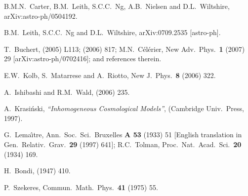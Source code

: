 \documentclass[12pt]{article}
\begin{document}
\begin{thebibliography}{66}
B.M.N.~Carter, B.M.~Leith, S.C.C.~Ng, A.B.~Nielsen and D.L.~Wiltshire,
arXiv:astro-ph/0504192.

B.M.~Leith, S.C.C.~Ng and D.L.~Wiltshire,
arXiv:0709.2535 [astro-ph].

T.~Buchert,
 (2005) L113; %
 (2006) 817; %
M.N.~C\'el\'erier,
New Adv.\ Phys.\ {\bf1} (2007) 29 [arXiv:astro-ph/0702416];
and references therein.

E.W.~Kolb, S.~Matarrese and A.~Riotto,
New J.\ Phys.\ {\bf8} (2006) 322. %

A.~Ishibashi and R.M.~Wald,
 (2006) 235. %

A.~Krasi\'nski, {\em``Inhomogeneous Cosmological Models''},
(Cambridge Univ.\ Press, 1997).

G.~Lema\^{\i}tre,
Ann.\ Soc.\ Sci.\ Bruxelles {\bf A 53} (1933) 51
[English translation in Gen.\ Relativ.\ Grav.\ {\bf29} (1997) 641];
R.C.~Tolman,
Proc.\ Nat.\ Acad.\ Sci.\ {\bf 20} (1934) 169.

H.~Bondi,
 (1947) 410.

P.~Szekeres,
Commun.\ Math.\ Phys.\ {\bf 41} (1975) 55.


\end{thebibliography}
\end{document}
